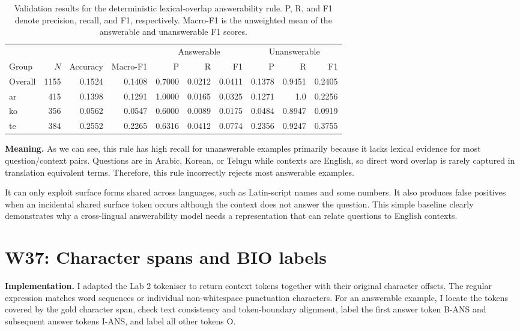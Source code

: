 \documentclass[11pt,a4paper]{article}
\begin{document}
\begin{table}[!h]
    \centering
    \small
    \begin{tabular}{lrrrrrrrrr}
        \toprule
        & & & &
        \multicolumn{3}{c}{Answerable}
        & \multicolumn{3}{c}{Unanswerable} \\
        \cmidrule(lr){5-7}\cmidrule(lr){8-10}
        Group & $N$ & Accuracy & Macro-F1
        & P & R & F1
        & P & R & F1 \\
        \midrule
            Overall & 1155 & 0.1524 & 0.1408 & 0.7000 & 0.0212 & 0.0411 & 0.1378 & 0.9451 & 0.2405 \\
            ar & 415 & 0.1398 & 0.1291 & 1.0000 & 0.0165 & 0.0325 & 0.1271 & 1.0 & 0.2256 \\
            ko & 356 & 0.0562 & 0.0547 & 0.6000 & 0.0089 & 0.0175 & 0.0484 & 0.8947 & 0.0919 \\
            te & 384 & 0.2552 & 0.2265 & 0.6316 & 0.0412 & 0.0774 & 0.2356 & 0.9247 & 0.3755 \\
        \bottomrule
    \end{tabular}
    \caption{Validation results for the deterministic lexical-overlap answerability rule. P, R, and F1 denote precision, recall, and F1, respectively. Macro-F1 is the unweighted mean of the answerable and unanswerable F1 scores.}
    \label{table:week_36_baseline_results}
\end{table}

\textbf{Meaning.}
As we can see, this rule has high recall for unanswerable examples primarily because it lacks lexical evidence for most question/context pairs. Questions are in Arabic, Korean, or Telugu while contexts are English, so direct word overlap is rarely captured in translation equivalent terms. Therefore, this rule incorrectly rejects most answerable examples. 

\noindent
It can only exploit surface forms shared across languages, such as Latin-script names and some numbers. It also produces false positives when an incidental shared surface token occurs although the context does not answer the question. This simple baseline clearly demonstrates why a cross-lingual answerability model needs a representation that can relate questions to English contexts.

\section{W37: Character spans and BIO labels}
\textbf{Implementation.} I adapted the Lab 2 tokeniser to return context tokens together with their original character offsets. The regular expression matches word sequences or individual non-whitespace punctuation characters. For an answerable example, I locate the tokens covered by the gold character span, check text consistency and token-boundary alignment, label the first answer token B-ANS and subsequent answer tokens I-ANS, and label all other tokens O.
\end{document}
